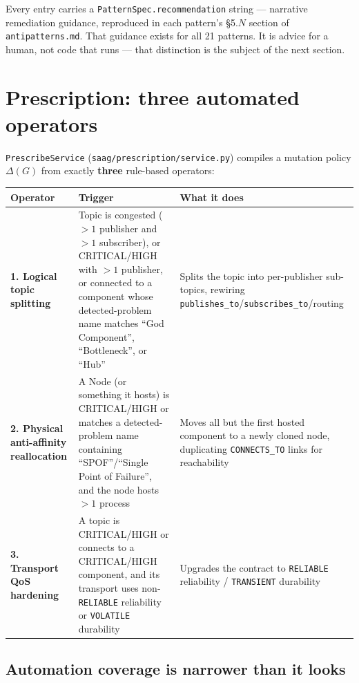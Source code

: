 \documentclass[11pt]{article}
\begin{document}
Every entry carries a \texttt{PatternSpec.recommendation} string --- narrative remediation guidance, reproduced in each pattern's \S5.$N$ section of \texttt{antipatterns.md}. That guidance exists for all 21 patterns. It is advice for a human, not code that runs --- that distinction is the subject of the next section.

\section{Prescription: three automated operators}

\texttt{PrescribeService} (\texttt{saag/prescription/service.py}) compiles a mutation policy $\Delta(G)$ from exactly \textbf{three} rule-based operators:

\begin{center}
\begin{tabular}{@{}p{3.4cm}p{5cm}p{6cm}@{}}
\toprule
\textbf{Operator} & \textbf{Trigger} & \textbf{What it does} \\
\midrule
\textbf{1. Logical topic splitting} & Topic is congested ($>1$ publisher and $>1$ subscriber), or CRITICAL/HIGH with $>1$ publisher, or connected to a component whose detected-problem name matches ``God Component'', ``Bottleneck'', or ``Hub'' & Splits the topic into per-publisher sub-topics, rewiring \texttt{publishes\_to}/\texttt{subscribes\_to}/routing \\
\textbf{2. Physical anti-affinity reallocation} & A Node (or something it hosts) is CRITICAL/HIGH or matches a detected-problem name containing ``SPOF''/``Single Point of Failure'', and the node hosts $>1$ process & Moves all but the first hosted component to a newly cloned node, duplicating \texttt{CONNECTS\_TO} links for reachability \\
\textbf{3. Transport QoS hardening} & A topic is CRITICAL/HIGH or connects to a CRITICAL/HIGH component, and its transport uses non-\texttt{RELIABLE} reliability or \texttt{VOLATILE} durability & Upgrades the contract to \texttt{RELIABLE} reliability / \texttt{TRANSIENT} durability \\
\bottomrule
\end{tabular}
\end{center}

\subsection{Automation coverage is narrower than it looks}
\end{document}
